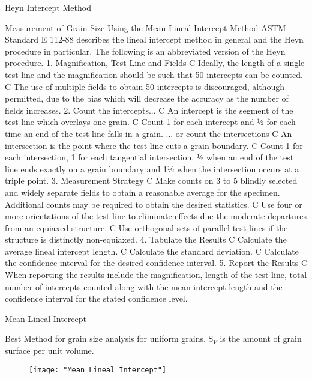\documentclass[10pt]{beamer}
\begin{document}
{\begin{frame}[fragile]{Heyn Intercept Method}
							
							Measurement of Grain Size Using the Mean Lineal Intercept Method
ASTM Standard E 112-88 describes the lineal intercept method in general and the Heyn procedure
in particular. The following is an abbreviated version of the Heyn procedure.
1. Magnification, Test Line and Fields
C Ideally, the length of a single test line and the magnification should be such that 50 intercepts
can be counted.
C The use of multiple fields to obtain 50 intercepts is discouraged, although permitted, due to the
bias which will decrease the accuracy as the number of fields increases.
2. Count the intercepts...
C An intercept is the segment of the test line which overlays one grain.
C Count 1 for each intercept and ½ for each time an end of the test line falls in a grain.
... or count the intersections
C An intersection is the point where the test line cuts a grain boundary.
C Count 1 for each intersection, 1 for each tangential intersection, ½ when an end of the test line
ends exactly on a grain boundary and 1½ when the intersection occurs at a triple point.
3. Measurement Strategy
C Make counts on 3 to 5 blindly selected and widely separate fields to obtain a reasonable average
for the specimen. Additional counts may be required to obtain the desired statistics.
C Use four or more orientations of the test line to eliminate effects due the moderate departures
from an equiaxed structure.
C Use orthogonal sets of parallel test lines if the structure is distinctly non-equiaxed.
4. Tabulate the Results
C Calculate the average lineal intercept length.
C Calculate the standard deviation.
C Calculate the confidence interval for the desired confidence interval.
5. Report the Results
C When reporting the results include the magnification, length of the test line, total number of
intercepts counted along with the mean intercept length and the confidence interval for the stated
confidence level.
    
\end{frame}
}


{%
\begin{frame}[fragile]{Mean Lineal Intercept}

Best Method for grain size analysis for uniform grains. S$ _{V} $ is the amount of grain surface per unit volume.

\begin{figure}[H]
\texttt{[image: "Mean Lineal Intercept"]}
\end{figure}
    
\end{frame}
}
\end{document}

